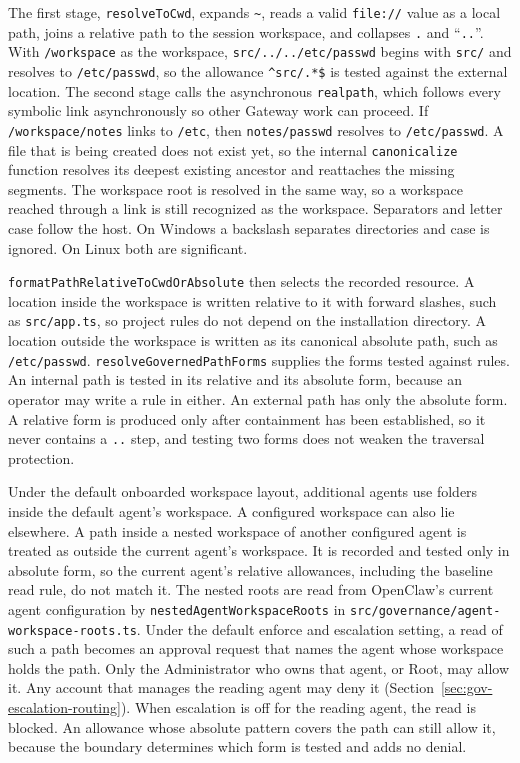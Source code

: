 {\color{red}\setlength{\emergencystretch}{2em}The first stage, \texttt{resolveToCwd}, expands \texttt{\textasciitilde},
reads a valid \texttt{file://} value as a local path, joins a relative path to
the session workspace, and collapses \texttt{.} and ``\texttt{..}''. With
\texttt{/workspace} as the workspace, \texttt{src/../../etc/passwd} begins with
\texttt{src/} and resolves to \texttt{/etc/passwd}, so the allowance
\texttt{\^{}src/.*\$} is tested against the external location. The second
stage calls the asynchronous \texttt{realpath}, which follows every symbolic
link asynchronously so other Gateway work can proceed. If \texttt{/workspace/notes} links to
\texttt{/etc}, then \texttt{notes/passwd} resolves to \texttt{/etc/passwd}. A
file that is being created does not exist yet, so the internal
\texttt{canonicalize} function resolves its deepest existing ancestor and
reattaches the missing segments. The workspace root is resolved in the same
way, so a workspace reached through a link is still recognized as the
workspace. Separators and letter case follow the host. On Windows a backslash
separates directories and case is ignored. On Linux both are significant.

\texttt{formatPathRelativeToCwdOrAbsolute} then selects the recorded resource.
A location inside the workspace is written relative to it with forward
slashes, such as \texttt{src/app.ts}, so project rules do not depend on the
installation directory. A location outside the workspace is written as its
canonical absolute path, such as \texttt{/etc/passwd}.
\texttt{resolveGovernedPathForms} supplies the forms tested against rules. An
internal path is tested in its relative and its absolute form, because an
operator may write a rule in either. An external path has only the absolute
form. A relative form is produced only after containment has been
established, so it never contains a \texttt{..} step, and testing two forms
does not weaken the traversal protection.

Under the default onboarded workspace layout, additional agents use folders
inside the default agent's workspace. A configured workspace can also lie
elsewhere. A path inside a nested workspace of another configured agent is treated
as outside the current agent's workspace. It is recorded and tested only in
absolute form, so the current agent's relative allowances, including the
baseline read rule, do not match it. The nested roots are read from OpenClaw's
current agent configuration by \texttt{nestedAgentWorkspaceRoots} in
\texttt{src/governance/\allowbreak agent-workspace-roots.ts}. Under the default enforce and escalation
setting, a read of such a path becomes an approval request that names the
agent whose workspace holds the path. Only the Administrator who owns that
agent, or Root, may allow it. Any account that manages the reading agent may
deny it (Section~\ref{sec:gov-escalation-routing}). When escalation is off for
the reading agent, the read is blocked. An allowance whose absolute pattern
covers the path can still allow it, because the boundary determines which
form is tested and adds no denial.

}
